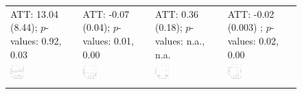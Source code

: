 \documentclass[12pt]{article}
\begin{document}
\begin{figure}[!ht]
\begin{minipage}{1\linewidth}
{{\begin{tabular}{C{3.8cm}C{3.8cm}C{3.8cm}C{3.8cm}}
   \citet{Payson2020jop} \newline  ATT: 13.04 (8.44); \newline $p$-values: 0.92, 0.03 & 
   \citet{Pierskalla2018} \newline ATT: -0.07 (0.04); \newline $p$-values: 0.01, 0.00 &
   \citet{Ravanilla2022} \newline ATT:  0.36 (0.18); \newline $p$-values: n.a., n.a. &
      \citet{Schafer2021} \newline  ATT: -0.02 (0.003) ; \newline $p$-values: 0.02, 0.00\\ 
   \hspace{-2em}  \includegraphics[width = 0.22\textwidth]{figure/fect/paysonb_fect_entry.png} & 
   \hspace{-2em}  \includegraphics[width = 0.22\textwidth]{figure/fect/Pierskalla_fect_entry.png} &
   \hspace{-2em}  \includegraphics[width = 0.22\textwidth]{figure/fect/ravanilla_fect_entry.png} & 
      \hspace{-2em}\includegraphics[width = 0.22\textwidth]{figure/fect/schafer_fect_entry.png} \\ \\ 

\end{tabular}}}
\end{minipage}
\end{figure}
\end{document}
